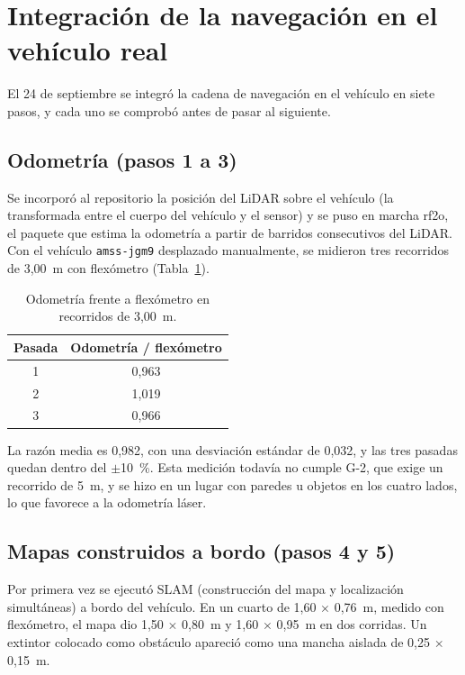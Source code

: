\documentclass[12pt,letterpaper]{article}
\begin{document}
\section{Integración de la navegación en el vehículo real}
\label{sec:integracion}

El 24 de septiembre se integró la cadena de navegación en el vehículo en siete pasos, y cada uno se comprobó antes de pasar al siguiente.

\subsection{Odometría (pasos 1 a 3)}

Se incorporó al repositorio la posición del LiDAR sobre el vehículo (la transformada entre el cuerpo del vehículo y el sensor) y se puso en marcha rf2o, el paquete que estima la odometría a partir de barridos consecutivos del LiDAR. Con el vehículo \texttt{amss-jgm9} desplazado manualmente, se midieron tres recorridos de 3,00~m con flexómetro (Tabla~\ref{tab:odometria}).

\begin{table}[H]
    \centering
    \small
    \caption{Odometría frente a flexómetro en recorridos de 3,00~m.}
    \label{tab:odometria}
    \begin{tabular}{@{}cc@{}}
        \toprule
        \textbf{Pasada} & \textbf{Odometría / flexómetro} \\ \midrule
        1 & 0,963 \\
        2 & 1,019 \\
        3 & 0,966 \\ \bottomrule
    \end{tabular}
\end{table}

La razón media es 0,982, con una desviación estándar de 0,032, y las tres pasadas quedan dentro del $\pm$10~\%. Esta medición todavía no cumple G-2, que exige un recorrido de 5~m, y se hizo en un lugar con paredes u objetos en los cuatro lados, lo que favorece a la odometría láser.

\subsection{Mapas construidos a bordo (pasos 4 y 5)}

Por primera vez se ejecutó SLAM (construcción del mapa y localización simultáneas) a bordo del vehículo. En un cuarto de 1,60 $\times$ 0,76~m, medido con flexómetro, el mapa dio 1,50 $\times$ 0,80~m y 1,60 $\times$ 0,95~m en dos corridas. Un extintor colocado como obstáculo apareció como una mancha aislada de 0,25 $\times$ 0,15~m.
\end{document}
